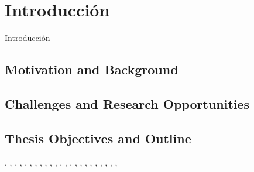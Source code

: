 \chapter{Introducción}
Introducción

\section{Motivation and Background}


\section{Challenges and Research Opportunities}


\section{Thesis Objectives and Outline}




\cite{10735355},
\cite{10679076},
\cite{10472698},
\cite{10382632},
\cite{10269751},
\cite{10091779},
\cite{10136711},
\cite{10015728},
\cite{9937167},
\cite{9738734},
\cite{9913469},
\cite{9360490},
\cite{9340547},
\cite{9242285},
\cite{9184122},
\cite{9299429},
\cite{9046048},
\cite{8322257},
\cite{7945527},
\cite{8013775},
\cite{7956250},
\cite{7836306},
\cite{7604136},



